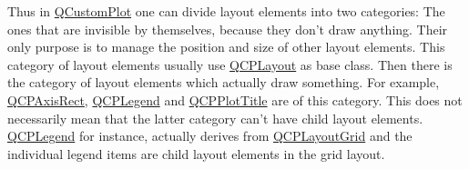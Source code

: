 \-Thus in \hyperlink{classQCustomPlot}{\-Q\-Custom\-Plot} one can divide layout elements into two categories\-: \-The ones that are invisible by themselves, because they don't draw anything. \-Their only purpose is to manage the position and size of other layout elements. \-This category of layout elements usually use \hyperlink{classQCPLayout}{\-Q\-C\-P\-Layout} as base class. \-Then there is the category of layout elements which actually draw something. \-For example, \hyperlink{classQCPAxisRect}{\-Q\-C\-P\-Axis\-Rect}, \hyperlink{classQCPLegend}{\-Q\-C\-P\-Legend} and \hyperlink{classQCPPlotTitle}{\-Q\-C\-P\-Plot\-Title} are of this category. \-This does not necessarily mean that the latter category can't have child layout elements. \hyperlink{classQCPLegend}{\-Q\-C\-P\-Legend} for instance, actually derives from \hyperlink{classQCPLayoutGrid}{\-Q\-C\-P\-Layout\-Grid} and the individual legend items are child layout elements in the grid layout. 

